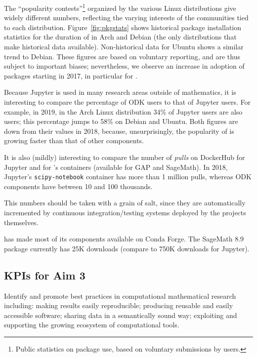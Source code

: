 \begin{enumerate}
  The ``popularity contests''\footnote{Public statistics on package
    use, based on voluntary submissions by users.} organized by the
  various Linux distributions give widely different numbers,
  reflecting the varying interests of the communities tied to each
  distribution. Figure~\ref{fig:pkgstats} shows historical package
  installation statistics for the duration of \ODK in Arch and Debian
  (the only distributions that make historical data
  available). Non-historical data for Ubuntu shows a similar trend to
  Debian. These figures are based on voluntary reporting, and are thus
  subject to important biases; nevertheless, we observe an increase in
  adoption of \ODK packages starting in 2017, in particular for
  \Jupyter.
  
  Because Jupyter is used in many research areas outside of
  mathematics, it is interesting to compare the percentage of ODK
  users to that of Jupyter users. For example, in 2019, in the Arch
  Linux distribution 34\% of Jupyter users are also \ODK users; this
  percentage jumps to 58\% on Debian and Ubuntu. Both figures are down
  from their values in 2018, because, unsurprisingly, the popularity
  of \Jupyter is growing faster than that of other \ODK components.
  
  \noindent
  It is also (mildly) interesting to compare the number of
  \emph{pulls} on DockerHub for Jupyter and for \ODK's containers
  (available for GAP and SageMath). In 2018, Jupyter's
  \texttt{scipy-notebook} container has more than 1 million pulls,
  whereas ODK components have between 10 and 100 thousands.

  \noindent
  This numbers should be taken with a grain of salt, since they are
  automatically incremented by continuous integration/testing systems
  deployed by the projects themselves.

  \noindent
  \ODK has made most of its components available on Conda Forge. The
  SageMath 8.9 package currently has 25K downloads (compare to 750K
  downloads for Jupyter).
\end{enumerate}

\subsection{KPIs for Aim 3}

\begin{aim}
  Identify and promote best practices in computational mathematical research including: making results easily reproducible; producing
  reusable and easily accessible software; sharing data in a semantically sound way; exploiting and supporting the growing
  ecosystem of computational tools.
\end{aim}

